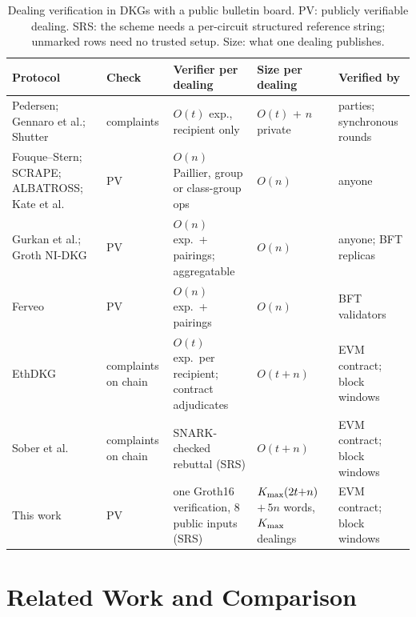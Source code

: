 \begin{table}[tb]
\centering
\caption{Dealing verification in DKGs with a public bulletin board. PV: publicly verifiable dealing. SRS: the scheme needs a per-circuit structured reference string; unmarked rows need no trusted setup. Size: what one dealing publishes.}
\label{tab:related}
\scriptsize
\setlength{\tabcolsep}{3pt}
\renewcommand{\arraystretch}{1.1}
\begin{tabular}{@{}>{\raggedright\arraybackslash}p{2.9cm}>{\raggedright\arraybackslash}p{1.4cm}>{\raggedright\arraybackslash}p{3.1cm}>{\raggedright\arraybackslash}p{1.6cm}>{\raggedright\arraybackslash}p{2.3cm}@{}}
\hline
Protocol & Check & Verifier per dealing & Size per dealing & Verified by \\
\hline
Pedersen; Gennaro et al.; Shutter \cite{pedersen1991threshold,gennaro1999secure,shutter2024} & complaints & $O(t)$ exp., recipient only & $O(t)$ + $n$ private & parties; synchronous rounds \\
Fouque--Stern; SCRAPE; ALBATROSS; Kate et al.\ \cite{fouque2001oneround,cascudo2017scrape,cascudo2020albatross,kate2024classgroups} & PV & $O(n)$ Paillier, group or class-group ops & $O(n)$ & anyone \\
Gurkan et al.; Groth NI-DKG \cite{gurkan2021aggregatable,groth2021nidkg} & PV & $O(n)$ exp.\ + pairings; aggregatable & $O(n)$ & anyone; BFT replicas \\
Ferveo \cite{bebel2022ferveo} & PV & $O(n)$ exp.\ + pairings & $O(n)$ & BFT validators \\
EthDKG \cite{schindler2019ethdkg} & complaints on chain & $O(t)$ exp.\ per recipient; contract adjudicates & $O(t+n)$ & EVM contract; block windows \\
Sober et al.\ \cite{sober2023zksnark} & complaints on chain & SNARK-checked rebuttal (SRS) & $O(t+n)$ & EVM contract; block windows \\
This work & PV & one Groth16 verification, $8$ public inputs (SRS) & $K_{\max}(2t{+}n)$ ${+}\,5n$ words, $K_{\max}$ dealings & EVM contract; block windows \\
\hline
\end{tabular}
\end{table}

\section{Related Work and Comparison}
\label{sec:related}

